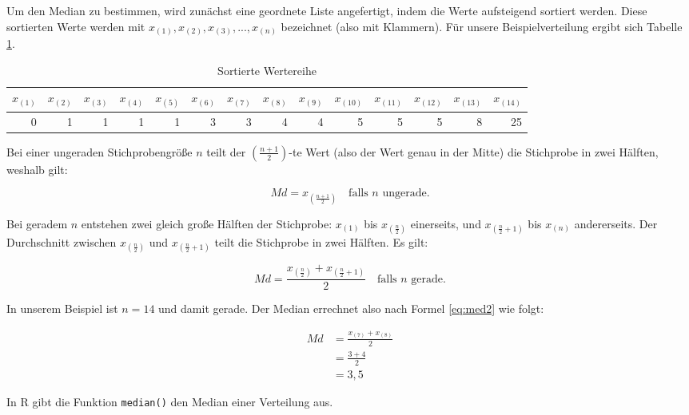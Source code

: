 \documentclass[
  11pt,
  ngerman,
  a4paper,
]{report}
\newenvironment{rtip}{
  \medskip
  \begin{tcolorbox}[colframe=purple,colback=light_gray,title=Softwarehinweis]
}{
  \end{tcolorbox}
  \medskip
}
\begin{document}
Um den Median zu bestimmen, wird zunächst eine geordnete Liste angefertigt, indem die Werte aufsteigend sortiert werden. Diese sortierten Werte werden mit \(x_{(1)}, x_{(2)}, x_{(3)}, ..., x_{(n)}\) bezeichnet (also mit Klammern). Für unsere Beispielverteilung ergibt sich Tabelle \ref{tab:sort}.

\begin{table}

\caption{\label{tab:sort}Sortierte Wertereihe}
\centering
\begin{tabular}[t]{rrrrrrrrrrrrrr}
\toprule
$x_{(1)}$ & $x_{(2)}$ & $x_{(3)}$ & $x_{(4)}$ & $x_{(5)}$ & $x_{(6)}$ & $x_{(7)}$ & $x_{(8)}$ & $x_{(9)}$ & $x_{(10)}$ & $x_{(11)}$ & $x_{(12)}$ & $x_{(13)}$ & $x_{(14)}$\\
\midrule
0 & 1 & 1 & 1 & 1 & 3 & 3 & 4 & 4 & 5 & 5 & 5 & 8 & 25\\
\bottomrule
\end{tabular}
\end{table}

Bei einer ungeraden Stichprobengröße \(n\) teilt der \((\frac{n+1}{2})\)-te Wert (also der Wert genau in der Mitte) die Stichprobe in zwei Hälften, weshalb gilt:

\[
  \mathit{Md} = x_{(\frac{n+1}{2})} \quad \text{falls }n\text{ ungerade.}
  \label{eq:med1}
\]

Bei geradem \(n\) entstehen zwei gleich große Hälften der Stichprobe: \(x_{(1)}\) bis \(x_{(\frac{n}{2})}\) einerseits, und \(x_{(\frac{n}{2}+1)}\) bis \(x_{(n)}\) andererseits. Der Durchschnitt zwischen \(x_{(\frac{n}{2})}\) und \(x_{(\frac{n}{2}+1)}\) teilt die Stichprobe in zwei Hälften. Es gilt:

\[
  \mathit{Md} = \frac{x_{(\frac{n}{2})} + x_{(\frac{n}{2}+1)}}{2} \quad \text{falls } n \text{ gerade.}
  \label{eq:med2}
\]

In unserem Beispiel ist \(n=14\) und damit gerade. Der Median errechnet also nach Formel \eqref{eq:med2} wie folgt:

\[
  \begin{aligned}
    \mathit{Md} & = \frac{x_{(7)} + x_{(8)}}{2} \\[4pt]
                & = \frac{3 + 4}{2} \\[4pt]
                & = 3{,}5
  \end{aligned}
\]

\begin{rtip}
In R gibt die Funktion \verb|median()| den Median einer Verteilung aus.
\end{rtip}
\end{document}
